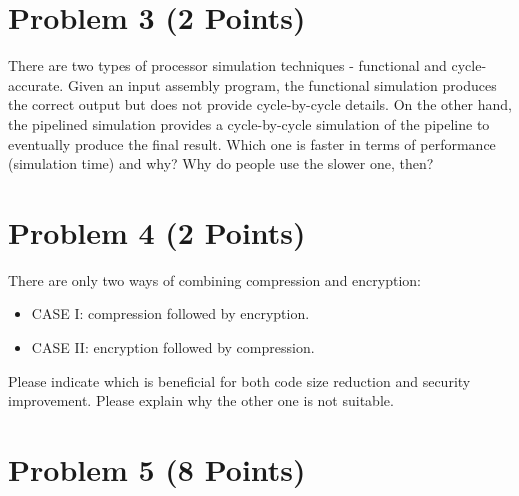 \documentclass[11pt,letterpaper]{article}
\begin{document}
	
	\vspace{40mm}
	
	
	\section*{Problem 3 (2 Points)}
	
	There are two types of processor simulation techniques - functional and cycle-accurate. Given an input assembly program, the functional simulation produces the correct output but does not provide cycle-by-cycle  details. On  the  other  hand,  the  pipelined  simulation  provides  a cycle-by-cycle  simulation  of  the pipeline  to  eventually  produce  the  final  result. Which one  is  faster  in  terms  of  performance  (simulation time) and why? Why do people use the slower one, then?
	
	
	
	\newpage
	\section*{Problem 4 (2 Points)}
	
	There are only two ways of combining compression and encryption: 
	
	\begin{itemize}
		\item CASE I: compression followed by encryption.
		\item CASE II: encryption followed by compression.
	\end{itemize}
	
	Please  indicate  which  is beneficial for both  code  size  reduction  and  security  improvement.  Please explain why the other one is not suitable.
	
	
	\vspace{25mm}
	
	\pagebreak
	\section*{Problem 5 (8 Points)}
	
\end{document}
